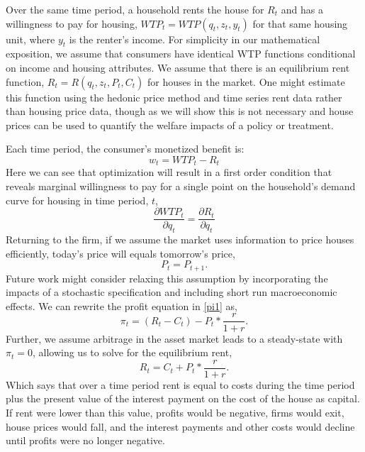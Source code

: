 \documentclass[ecta,nameyear,draft]{econsocart}
\theoremstyle{plain}
\theoremstyle{remark}
\begin{document}
Over the same time period, a household rents the house for $R_t$ and has a willingness to pay for housing, $\mathit{WTP}_t=\mathit{WTP}(q_t,z_t,y_t)$ for that same housing unit, where $y_t$ is the renter's income. For simplicity in our mathematical exposition, we assume that consumers have identical WTP functions conditional on income and housing attributes. We  assume that there is an equilibrium rent function, $R_t=R(q_t,z_t,P_t,C_t)$ for houses in the market. One might estimate this function using the hedonic price method and time series rent data rather than housing price data, though as we will show this is not necessary and house prices can be used to quantify the welfare impacts of a policy or treatment. 

Each time period, the consumer’s monetized benefit is:
\begin{equation*}
	 w_t=\mathit{WTP}_t-R_t
\end{equation*}
Here we can see that optimization will result in a first order condition that reveals marginal willingness
to pay for a single point on the household’s demand curve for housing in time period, $t$,
\begin{equation}
	\frac{\partial \mathit{WTP}_t}{\partial q_t}=\frac{\partial R_t}{\partial q_t} \label{foc}
\end{equation}
Returning to the firm, if we assume the market uses information to price houses efficiently, today’s price will equals tomorrow’s
price,
\begin{equation*}
	P_t=P_{t+1}.
\end{equation*}
Future work might consider relaxing this assumption by incorporating the impacts of a stochastic
specification and including short run macroeconomic effects.
We can rewrite the profit equation in \ref{pi1} as,
\begin{equation}
	\pi_t=(R_t-C_t)-P_t*\frac{r}{1+r}.\label{pi1.1}
\end{equation}
Further, we assume arbitrage in the asset market leads to a steady-state with $\pi_t=0$, allowing us to solve for the equilibrium rent,
\begin{equation*}
	R_t=C_t+P_t*\frac{r}{1+r}.
\end{equation*}
Which says that over a time period rent is equal to costs during the time period plus the present value of
the interest payment on the cost of the house as capital. If rent were lower than this value, profits
would be negative, firms would exit, house prices would fall, and the interest payments and other costs
would decline until profits were no longer negative.
\end{document}
